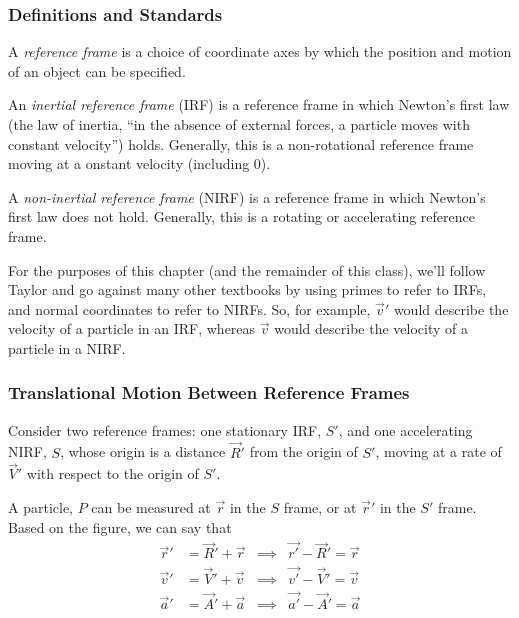 \documentclass[a4paper]{article}
\begin{document}
\subsubsection{Definitions and Standards}
\begin{defi}
	A \emph{reference frame} is a choice of coordinate axes by which the
	position and motion of an object can be specified.
\end{defi}
\begin{defi}
	An \emph{inertial reference frame} (IRF) is a reference frame in which
	Newton's first law (the law of inertia, ``in the absence of external
	forces, a particle moves with constant velocity'') holds.
	Generally, this is a non-rotational reference frame moving at a
	onstant velocity (including 0).
\end{defi}
\begin{defi}
	A \emph{non-inertial reference frame} (NIRF) is a reference frame in
	which Newton's first law does not hold. Generally, this is a
	rotating or accelerating reference frame.
\end{defi}

For the purposes of this chapter (and the remainder of this class), we'll
follow Taylor and go against many other textbooks by using primes to refer to
IRFs, and normal coordinates to refer to NIRFs. So, for example,
$\vec{v}'$ would describe the velocity of a particle in an IRF, whereas 
$\vec{v}$ would describe the velocity of a particle in a NIRF.

\subsubsection{Translational Motion Between Reference Frames}
Consider two reference frames: one stationary IRF, $S'$, and one
accelerating NIRF, $S$, whose origin is a distance $\vec{R}'$ from the origin
of $S'$, moving at a rate of $\vec{V}'$ with respect to the origin of $S'$.

\noindent
A particle, $P$ can be measured at $\vec{r}$ in the $S$ frame, or at
$\vec{r}'$ in the $S'$ frame. Based on the figure, we can say that
\begin{align*}
	\vec{r}'&=\vec{R}'+\vec{r} &\implies& \vec{r'}-\vec{R}'=\vec{r}\\
	\vec{v}'&=\vec{V}'+\vec{v} &\implies& \vec{v'}-\vec{V}'=\vec{v}\\
	\vec{a}'&=\vec{A}'+\vec{a} &\implies& \vec{a'}-\vec{A}'=\vec{a}
\end{align*}
\end{document}
